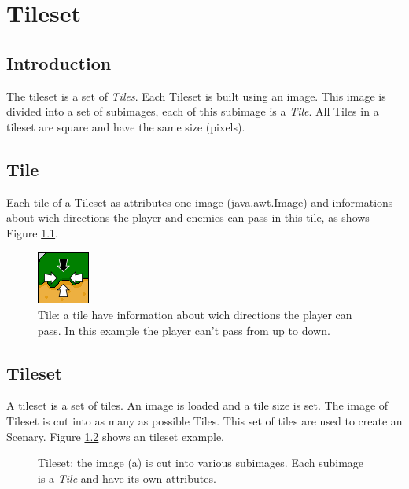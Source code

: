 \chapter{Tileset}\label{tileset}
	\section{Introduction}
		The tileset is a set of \emph{Tiles}. Each Tileset is built using an image. This image is divided into a set of subimages, each of this subimage is a \emph{Tile}. All Tiles in a tileset are square and have the same size (pixels).
	
	
	\section{Tile}
		Each tile of a Tileset as attributes one image (java.awt.Image) and informations about wich directions the player and enemies can pass in this tile, as shows Figure \ref{fig:tile}.
		
	\begin{figure}[h]
		\centering
		\includegraphics[]{img/tile.png}
		\caption{Tile: a tile have information about wich directions the player can pass. In this example the player can't pass from up to down.}
		\label{fig:tile}
	\end{figure}

	\section{Tileset}
		A tileset is a set of tiles. An image is loaded and a tile size is set. The image of Tileset is cut into as many as possible Tiles. This set of tiles are used to create an Scenary. Figure \ref{fig:tileset} shows an tileset example.
		\begin{figure}[h]
			\centering
			\qquad
			
			\caption{Tileset: the image (a) is cut into various subimages. Each subimage is a \emph{Tile} and have its own attributes.}
		\label{fig:tileset}
	\end{figure}
		
